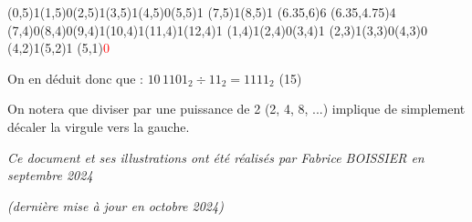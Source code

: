 \documentclass[11pt,a4paper]{article}
\begin{document}
\begin{center}
\begin{table}[ht!]
\begin{minipage}{0.2\textwidth}
\par\vspace{6\oplineheight}
\oplput(0,5){1}\oplput(1,5){0}\oplput(2,5){1}\oplput(3,5){1}\oplput(4,5){0}\oplput(5,5){1}
\oplput(7,5){1}\oplput(8,5){1}
\opvline(6.35,6){6}
\ophline(6.35,4.75){4}
\oplput(7,4){0}\oplput(8,4){0}\oplput(9,4){1}\oplput(10,4){1}\oplput(11,4){1}\oplput(12,4){1}
\oplput(1,4){1}\oplput(2,4){0}\oplput(3,4){1}
\oplput(2,3){1}\oplput(3,3){0}\oplput(4,3){0}
\oplput(4,2){1}\oplput(5,2){1}
\oplput(5,1){\textcolor{red}{0}}

  \end{minipage}
  \hfillx
  \begin{minipage}{0.1\textwidth}
    \centering

\phantom{$ \Rightarrow $}

  \end{minipage}
\end{table}

\end{center}

On en déduit donc que : $ 10 \, 1101_{2} \div 11_{2} = 1111_{2} $ (15)

\medskip

On notera que diviser par une puissance de 2 (2, 4, 8, ...) implique de simplement décaler la virgule vers la gauche.



\vfillFirst

\vfillLast

\begin{center}
\textit{Ce document et ses illustrations ont été réalisés par Fabrice BOISSIER en septembre 2024}

\textit{(dernière mise à jour en octobre 2024)}
\end{center}
\end{document}
